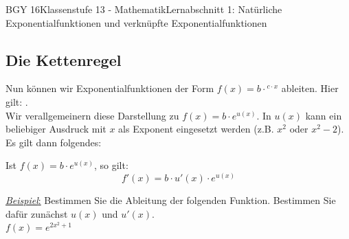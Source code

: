 \documentclass[11pt,twocolumn,oneside,openany,headings=optiontotoc,11pt,numbers=noenddot]{article}
\begin{document}
\begin{worksheet}{BGY 16}{Klassenstufe 13 - Mathematik}{Lernabschnitt 1: Natürliche Exponentialfunktionen und verknüpfte Exponentialfunktionen}
		\subsection{Die Kettenregel}
		Nun können wir Exponentialfunktionen der Form \(f(x) = b\cdot{}^{c\cdot{}x}\) ableiten. Hier gilt: .\\
		Wir verallgemeinern diese Darstellung zu \(f(x) = b\cdot{}e^{u(x)}\). In \(u(x)\) kann ein beliebiger Ausdruck mit \grq{}\(x\)\grq{} als Exponent eingesetzt werden (z.B. \(x^2\) oder \(x^2-2\)).\\
		Es gilt dann folgendes:
		\begin{framed}
			\noindent
			Ist \(f(x) = b\cdot{}e^{u(x)}\), so gilt: \[f'(x) = b\cdot{}u'(x)\cdot{}e^{u(x)}\]
		\end{framed}
		\noindent
		\underline{\textit{Beispiel}:} Bestimmen Sie die Ableitung der folgenden Funktion. Bestimmen Sie dafür zunächst \(u(x)\) und \(u'(x)\).\\
		\(f(x) = e^{2x^2+1}\)
	\end{worksheet}
\end{document}
